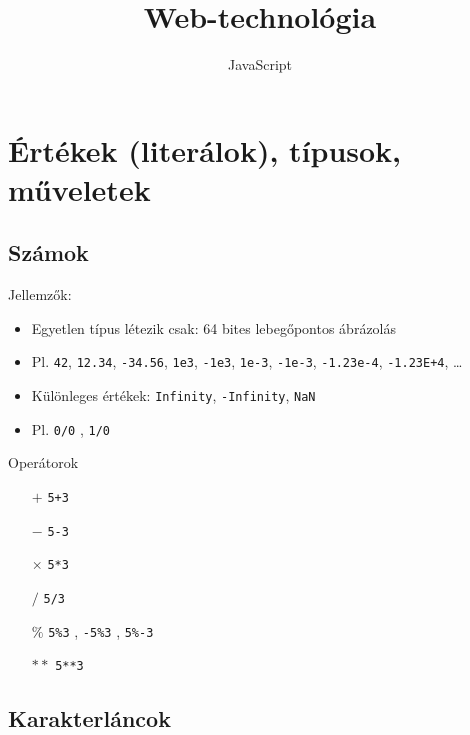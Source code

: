 \documentclass[usenames,dvipsnames,aspectratio=169]{beamer}
\title[Web technológiák - JavaScript]{Web-technológia}
\subtitle{JavaScript}
\begin{document}
\begin{frame}[plain]
  \titlepage
  \logoalul
\end{frame}

\section{Értékek (literálok), típusok, műveletek}

\subsection{Számok}

\begin{frame}
    Jellemzők:
    \begin{itemize}
        \item Egyetlen típus létezik csak: 64 bites lebegőpontos ábrázolás
        \item Pl. \texttt{42}, \texttt{12.34}, \texttt{-34.56}, \texttt{1e3}, \texttt{-1e3}, \texttt{1e-3}, \texttt{-1e-3}, \texttt{-1.23e-4}, \texttt{-1.23E+4}, \dots
        \item Különleges értékek: \texttt{Infinity}, \texttt{-Infinity}, \texttt{NaN}
        \item Pl. \texttt{0/0} , \texttt{1/0} 
    \end{itemize}
    \vfill
    Operátorok
    \begin{itemize}
        \item[$+$] \texttt{5+3} 
        \item[$-$] \texttt{5-3}  
        \item[$\times$] \texttt{5*3} 
        \item[$/$] \texttt{5/3} 
        \item[$\%$] \texttt{5\%3} , \texttt{-5\%3} , \texttt{5\%-3}  
        \item[$**$] \texttt{5**3}  
    \end{itemize}
\end{frame}

\subsection{Karakterláncok}
\end{document}
